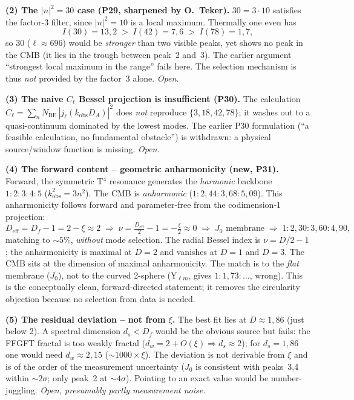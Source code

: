 \textbf{(2) The $|n|^2=30$ case (P29, sharpened by O.~Teker).}
$30=3\cdot10$ satisfies the factor-3 filter, since $|n|^2=10$ is a local
maximum. Thermally one even has
\[
  I(30)=13{,}2 \;>\; I(42)=7{,}6 \;>\; I(78)=1{,}7,
\]
so $30$ ($\ell\approx696$) would be \emph{stronger} than two visible peaks,
yet shows no peak in the CMB (it lies in the trough between peak~2 and~3). The
earlier argument ``strongest local maximum in the range'' fails here. The
selection mechanism is thus \emph{not} provided by the factor~3 alone.
\emph{Open.}

\textbf{(3) The naive $C_\ell$ Bessel projection is insufficient (P30).}
The calculation $C_\ell=\sum_n N_\mathrm{BE}\,|j_\ell(k_\mathrm{obs}D_A)|^2$
does \emph{not} reproduce $\{3,18,42,78\}$; it washes out to a quasi-continuum
dominated by the lowest modes. The earlier P30 formulation (``a feasible
calculation, no fundamental obstacle'') is withdrawn: a physical
source/window function is missing. \emph{Open.}

\textbf{(4) The forward content -- geometric anharmonicity (new, P31).}
Forward, the symmetric T$^4$ resonance generates the \emph{harmonic} backbone
$1:2:3:4:5$ ($k^2_\mathrm{obs}=3n^2$). The CMB is \emph{anharmonic}
($1:2{,}44:3{,}68:5{,}09$). This anharmonicity follows forward and
parameter-free from the codimension-1 projection:
\[
  D_\mathrm{eff}=D_f-1=2-\xi\approx2
  \;\Rightarrow\;
  \nu=\tfrac{D_\mathrm{eff}}{2}-1=-\tfrac{\xi}{2}\approx0
  \;\Rightarrow\;
  J_0\text{ membrane}
  \;\Rightarrow\;
  1:2{,}30:3{,}60:4{,}90,
\]
matching to $\sim5\%$, \emph{without} mode selection. The radial Bessel index
is $\nu=D/2-1$; the anharmonicity is maximal at $D=2$ and vanishes at $D=1$ and
$D=3$. The CMB sits at the dimension of maximal anharmonicity. The match is to
the \emph{flat} membrane ($J_0$), not to the curved 2-sphere (Y$_{\ell m}$,
gives $1:1{,}73:\ldots$, wrong). This is the conceptually clean, forward-directed
statement; it removes the circularity objection because no selection from data
is needed.

\textbf{(5) The residual deviation -- not from $\xi$.}
The best fit lies at $D\approx1{,}86$ (just below 2). A spectral dimension
$d_s<D_f$ would be the obvious source but fails: the FFGFT fractal is too
weakly fractal ($d_w=2+O(\xi)\Rightarrow d_s\approx2$); for $d_s=1{,}86$ one
would need $d_w\approx2{,}15$ ($\sim1000\times\xi$). The deviation is not
derivable from $\xi$ and is of the order of the measurement uncertainty ($J_0$
is consistent with peaks~3,4 within $\sim2\sigma$; only peak~2 at
$\sim4\sigma$). Pointing to an exact value would be number-juggling.
\emph{Open, presumably partly measurement noise.}

